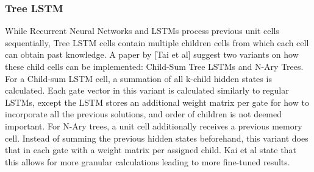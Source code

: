 \subsubsection{Tree LSTM}
While Recurrent Neural Networks and LSTMs process previous unit cells
sequentially, Tree LSTM cells \cite{DBLP:journals/corr/TaiSM15}
\cite{DBLP:journals/corr/ZhuSG15} \cite{DBLP:journals/corr/LeZ15} contain
multiple children cells from which each cell can obtain past knowledge. A paper
by [Tai et al] suggest two variants on how these child cells can be implemented:
Child-Sum Tree LSTMs and N-Ary Trees. For a Child-sum LSTM cell, a summation of
all k-child hidden states is calculated. Each gate vector in this variant is
calculated similarly to regular LSTMs, except the LSTM stores an additional
weight matrix per gate for how to incorporate all the previous solutions, and
order of children is not deemed important. For N-Ary trees, a unit cell
additionally receives a previous memory cell. Instead of summing the previous
hidden states beforehand, this variant does that in each gate with a weight
matrix per assigned child. Kai et al state that this allows for more granular
calculations leading to more fine-tuned results.
